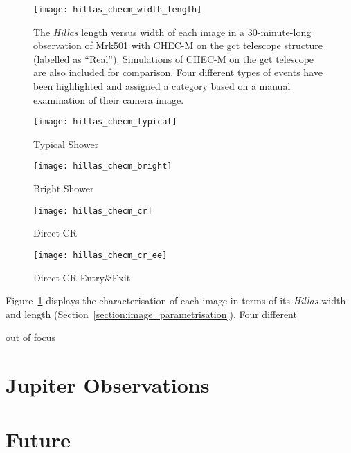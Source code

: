 \begin{figure}
  \texttt{[image: hillas\_checm\_width\_length]}
  \caption[\textit{Hillas} length versus width for an on-sky observing with CHEC-M.]{The \textit{Hillas} length versus width of each image in a 30-minute-long observation of Mrk501 with CHEC-M on the \gls{gct} telescope structure (labelled as ``Real''). Simulations of CHEC-M on the \gls{gct} telescope are also included for comparison. Four different types of events have been highlighted and assigned a category based on a manual examination of their camera image.}
  \label{fig:hillas_checm_width_length}
\end{figure}

\begin{sidewaysfigure}
  \begin{subfigure}[b]{0.49\textwidth}
    \texttt{[image: hillas\_checm\_typical]}
    \caption{Typical Shower}
    \label{fig:hillas_checm_typical}
  \end{subfigure}
  \hfill
  \begin{subfigure}[b]{0.49\textwidth}
    \texttt{[image: hillas\_checm\_bright]}
    \caption{Bright Shower}
    \label{fig:hillas_checm_bright}
  \end{subfigure}
   \hfill
  \begin{subfigure}[b]{0.49\textwidth}
    \texttt{[image: hillas\_checm\_cr]}
    \caption{Direct CR}
    \label{fig:hillas_checm_cr}
  \end{subfigure}
  \hfill
  \begin{subfigure}[b]{0.49\textwidth}
    \texttt{[image: hillas\_checm\_cr\_ee]}
    \caption{Direct CR Entry\&Exit}
    \label{fig:hillas_checm_cr_ee}
  \end{subfigure}
  \caption[Selection of Cherenkov images.]{A selection of images taken by \gls{chec-m} during its second on-telescope campaign. The images chosen correspond to the individually highlighted events in Figure~\ref{fig:hillas_checm_width_length}.}
\end{sidewaysfigure}

Figure~\ref{fig:hillas_checm_width_length} displays the characterisation of each image in terms of its \textit{Hillas} width and length (Section~\ref{section:image_parametrisation}). Four different 

out of focus



\section{Jupiter Observations}

\section{Future}

